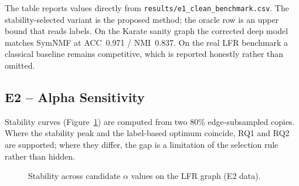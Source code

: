 \documentclass[11pt,a4paper]{article}
\begin{document}
The table reports values directly from \texttt{results/e1\_clean\_benchmark.csv}. The
stability-selected variant is the proposed method; the oracle row is an upper bound that
reads labels. On the Karate sanity graph the corrected deep model matches SymNMF at
ACC~0.971 / NMI~0.837. On the real LFR benchmark a classical baseline remains competitive,
which is reported honestly rather than omitted.

\subsection{E2 -- Alpha Sensitivity}
\begin{table}[H]
\centering
\small
{}
\caption{Alpha chosen by stability compared with the stability peak and the label-using oracle (upper bound).}
\label{tab:e2}
\end{table}
Stability curves (Figure~\ref{fig:e2}) are computed from two 80\% edge-subsampled copies.
Where the stability peak and the label-based optimum coincide, RQ1 and RQ2 are supported;
where they differ, the gap is a limitation of the selection rule rather than hidden.

\begin{figure}[H]
\centering
{}
\caption{Stability across candidate $\alpha$ values on the LFR graph (E2 data).}
\label{fig:e2}
\end{figure}
\end{document}

